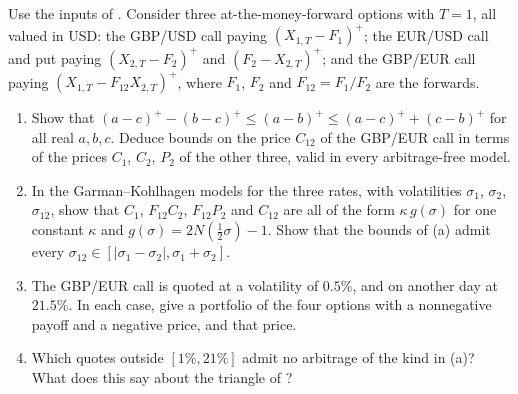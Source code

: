 \begin{exercise}\label{ex:ma-triangle}
\medium Use the inputs of . Consider three at-the-money-forward options with
$T=1$, all valued in USD: the GBP/USD call paying $(X_{1,T}-F_1)^+$; the EUR/USD call and put paying
$(X_{2,T}-F_2)^+$ and $(F_2-X_{2,T})^+$; and the GBP/EUR call paying $(X_{1,T}-F_{12}X_{2,T})^+$, where
$F_1$, $F_2$ and $F_{12}=F_1/F_2$ are the forwards.
\begin{enumerate}[label=(\alph*)]
  \item Show that $(a-c)^+-(b-c)^+\le(a-b)^+\le(a-c)^++(c-b)^+$ for all real $a,b,c$. Deduce bounds on the
    price $C_{12}$ of the GBP/EUR call in terms of the prices $C_1$, $C_2$, $P_2$ of the other three,
    valid in every arbitrage-free model.
  \item In the Garman--Kohlhagen models for the three rates, with volatilities $\sigma_1$, $\sigma_2$,
    $\sigma_{12}$, show that $C_1$, $F_{12}C_2$, $F_{12}P_2$ and $C_{12}$ are all of the form
    $\kappa\,g(\sigma)$ for one constant $\kappa$ and $g(\sigma)=2N(\frac12\sigma)-1$. Show that the bounds of (a)
    admit every $\sigma_{12}\in[|\sigma_1-\sigma_2|,\sigma_1+\sigma_2]$.
  \item The GBP/EUR call is quoted at a volatility of $0.5\%$, and on another day at $21.5\%$. In each
    case, give a portfolio of the four options with a nonnegative payoff and a negative price, and that
    price.
  \item Which quotes outside $[1\%,21\%]$ admit no arbitrage of the kind in (a)? What does this say
    about the triangle of ?
\end{enumerate}
\end{exercise}

